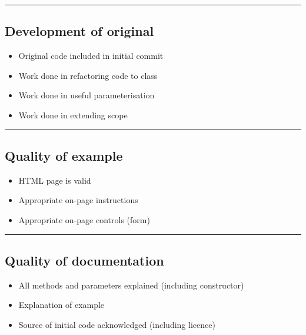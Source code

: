 \documentclass[]{article}
\providecommand{\tightlist}{%
  \setlength{\itemsep}{0pt}\setlength{\parskip}{0pt}}
\begin{document}
\begin{center}\rule{0.5\linewidth}{\linethickness}\end{center}

\hypertarget{development-of-original}{%
\subsection{Development of original}\label{development-of-original}}

\begin{itemize}
\tightlist
\item
  Original code included in initial commit
\item
  Work done in refactoring code to class
\item
  Work done in useful parameterisation
\item
  Work done in extending scope
\end{itemize}

\begin{center}\rule{0.5\linewidth}{\linethickness}\end{center}

\hypertarget{quality-of-example}{%
\subsection{Quality of example}\label{quality-of-example}}

\begin{itemize}
\tightlist
\item
  HTML page is valid
\item
  Appropriate on-page instructions
\item
  Appropriate on-page controls (form)
\end{itemize}

\begin{center}\rule{0.5\linewidth}{\linethickness}\end{center}

\hypertarget{quality-of-documentation}{%
\subsection{Quality of documentation}\label{quality-of-documentation}}

\begin{itemize}
\tightlist
\item
  All methods and parameters explained (including constructor)
\item
  Explanation of example
\item
  Source of initial code acknowledged (including licence)
\end{itemize}
\end{document}
